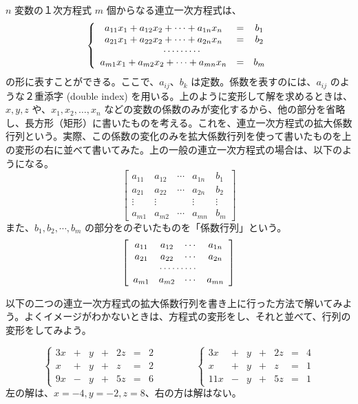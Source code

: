\medskip
$n$ 変数の１次方程式 $m$ 個からなる連立一次方程式は、
$$\left\{\begin{array}{ccc}
a_{11}x_1 + a_{12}x_2 + \cdots + a_{1n}x_n & = & b_1\\
a_{21}x_1 + a_{22}x_2 + \cdots + a_{2n}x_n & = & b_2\\
\multicolumn{3}{c}{\cdots\cdots\cdots} \\
a_{m1}x_1 + a_{m2}x_2 + \cdots + a_{mn}x_n & = & b_m
\end{array}\right.$$
の形に表すことができる。ここで、$a_{ij}$、$b_k$  は定数。係数を表すのには、$a_{ij}$ のような２重添字 (double index) を用いる。上のように変形して解を求めるときは、$x,y,z$ や、$x_1, x_2, \ldots, x_n$ などの変数の係数のみが変化するから、他の部分を省略し、長方形（矩形）に書いたものを考える。これを、連立一次方程式の{\gt 拡大係数行列}という。実際、この係数の変化のみを拡大係数行列を使って書いたものを上の変形の右に並べて書いてみた。上の一般の連立一次方程式の場合は、以下のようになる。
$$\left[\begin{array}{ccccc}
a_{11} & a_{12} & \cdots & a_{1n} & b_1\\
a_{21} & a_{22} & \cdots & a_{2n} & b_2\\
\vdots & \vdots &            & \vdots & \vdots\\
a_{m1} & a_{m2} & \cdots & a_{mn} & b_m
\end{array}
\right]$$
また、$b_1, b_2, \cdots, b_m$ の部分をのぞいたものを「係数行列」という。
$$\left[\begin{array}{cccc}
a_{11} & a_{12} & \cdots & a_{1n}\\
a_{21} & a_{22} & \cdots & a_{2n} \\
\multicolumn{4}{c}{\cdots\cdots\cdots}\\
a_{m1} & a_{m2} & \cdots & a_{mn}
\end{array}
\right]$$

以下の二つの連立一次方程式の拡大係数行列を書き上に行った方法で解いてみよう。よくイメージがわかないときは、方程式の変形をし、それと並べて、行列の変形をしてみよう。

$$\left\{\begin{array}{rrrrrrr}
3x & + & y  & + & 2z & = & 2\\
x & + & y & + & z & = & 2\\
9x & - & y & + & 5z & = & 6
\end{array}\right. \qquad\qquad 
\left\{\begin{array}{rrrrrrr}
3x & + & y  & + & 2z & = & 4\\
x & + & y & + & z & = & 1\\
11x & - & y & + & 5z & = & 1
\end{array}\right.$$
左の解は、$x = -4, y = -2, z = 8$、右の方は解はない。

